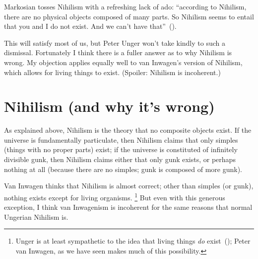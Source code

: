 Markosian tosses Nihilism with a refreshing lack of ado: ``according to Nihilism, there are no physical objects composed of many parts. So Nihilism seems to entail that you and I do not exist. And we can't have that''~(\citeyear[220]{markosian1998a}).

This will satisfy most of us, but Peter Unger won't take kindly to such a dismissal. Fortunately I think there is a fuller answer as to why Nihilism is wrong. My objection applies equally well to van Inwagen's version of Nihilism, which allows for living things to exist. (Spoiler: Nihilism is incoherent.)

\section{Nihilism (and why it's wrong)}
As explained above, Nihilism is the theory that no composite objects exist. If the universe is fundamentally particulate, then Nihilism claims that only simples (things with no proper parts) exist; if the universe is constituted of infinitely divisible gunk, then Nihilism claims either that only gunk exists, or perhaps nothing at all (because there are no simples; gunk is composed of more gunk).

Van Inwagen thinks that Nihilism is almost correct; other than simples (or gunk), nothing exists except for living organisms.%
%
\footnote{Unger is at least sympathetic to the idea that living things {\em do} exist~(\citeyear[151]{unger1979}); Peter van Inwagen, as we have seen makes much of this possibility.} %
%
But even with this generous exception, I think van Inwagenism is incoherent for the same reasons that normal Ungerian Nihilism is.

